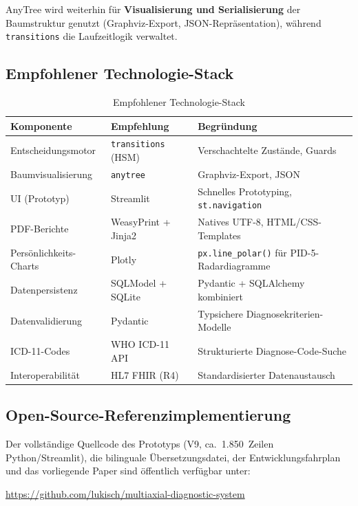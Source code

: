 \documentclass[11pt,a4paper]{article}
\begin{document}
AnyTree wird weiterhin f\"ur \textbf{Visualisierung und Serialisierung} der Baumstruktur genutzt (Graphviz-Export, JSON-Repr\"asentation), w\"ahrend \texttt{transitions} die Laufzeitlogik verwaltet.

\subsection{Empfohlener Technologie-Stack}

\begin{table}[H]
\centering
\caption{Empfohlener Technologie-Stack}
\label{tab:techstack}
\begin{tabularx}{\textwidth}{lXl}
\toprule
\textbf{Komponente} & \textbf{Empfehlung} & \textbf{Begr\"undung} \\
\midrule
Entscheidungsmotor & \texttt{transitions} (HSM) & Verschachtelte Zust\"ande, Guards \\
Baumvisualisierung & \texttt{anytree} & Graphviz-Export, JSON \\
UI (Prototyp) & Streamlit & Schnelles Prototyping, \texttt{st.navigation} \\
PDF-Berichte & WeasyPrint + Jinja2 & Natives UTF-8, HTML/CSS-Templates \\
Pers\"onlichkeits-Charts & Plotly & \texttt{px.line\_polar()} f\"ur PID-5-Radardiagramme \\
Datenpersistenz & SQLModel + SQLite & Pydantic + SQLAlchemy kombiniert \\
Datenvalidierung & Pydantic & Typsichere Diagnosekriterien-Modelle \\
ICD-11-Codes & WHO ICD-11 API & Strukturierte Diagnose-Code-Suche \\
Interoperabilit\"at & HL7 FHIR (R4) & Standardisierter Datenaustausch \\
\bottomrule
\end{tabularx}
\end{table}

\subsection{Open-Source-Referenzimplementierung}

Der vollst\"andige Quellcode des Prototyps (V9, ca.\ 1.850~Zeilen Python/Streamlit), die bilinguale \"Ubersetzungsdatei, der Entwicklungsfahrplan und das vorliegende Paper sind \"offentlich verf\"ugbar unter:

\begin{center}
\url{https://github.com/lukisch/multiaxial-diagnostic-system}
\end{center}
\end{document}
